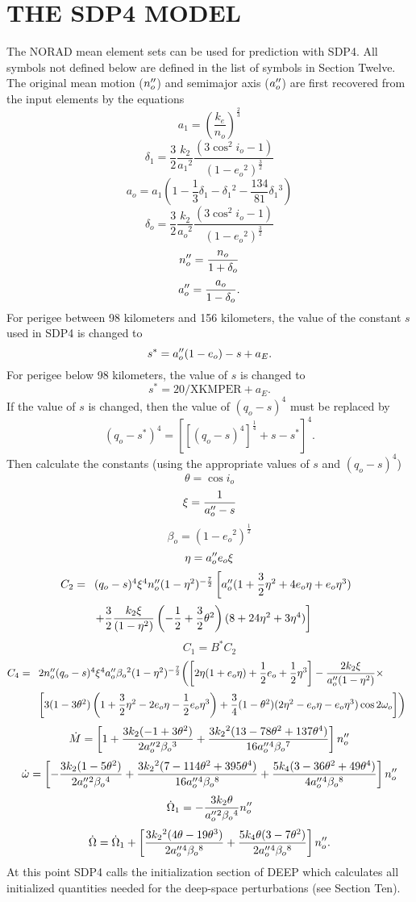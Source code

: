 \section[The SDP4 Model]{THE SDP4 MODEL}
The NORAD mean element sets can be used for prediction with SDP4.  All symbols
not defined below are defined in the list of symbols in Section Twelve.  The
original mean motion ($n''_o$) and semimajor axis ($a''_o$) are first
recovered from the input elements by the equations
\[a_1=\left(\dfrac{k_e}{n_o}\right)^{\frac23}\]
\[\delta_1=\dfrac32\dfrac{k_2}{a_1{}^2}\dfrac{(3\cos^2i_o-1)}
{(1-e_o{}^2)^{\frac32}}\]
\[a_o=a_1\left(1-\dfrac13\delta_1-\delta_1{}^2-\dfrac{134}{81}\delta_1{}^3\right)\]
\[\delta_o=\dfrac32\dfrac{k_2}{a_o{}^2}\dfrac{(3\cos^2i_o-1)}{(1-e_o{}^2)^{\frac32}}\]
\[n''_o={\displaystyle{n_o\over1+\delta_o}}\]
\[a''_o={\displaystyle{a_o\over1-\delta_o}}.\]
For perigee between 98 kilometers and 156 kilometers, the value of the
constant $s$ used in SDP4 is changed to
\[s^*=a''_o(1-e_o)-s+a_E.\]
For perigee below 98 kilometers, the value of $s$ is changed to
\[s^*=20/\mbox{XKMPER}+a_E.\]
If the value of $s$ is changed, then the value of $(q_o-s)^4$ must be replaced
by
\[(q_o-s^*)^4=\left[[(q_o-s)^4]^{\frac14}+s-s^*\right]^4.\]
Then calculate the constants (using the appropriate values of $s$ and
$(q_o-s)^4$)
\[\theta=\cos i_o\]
\[\xi={\displaystyle{1\over a''_o-s}}\]
\[\beta_o=(1-e_o{}^2)^{\frac12}\]
\[\eta=a''_o e_o\xi\]
\[C_2=\begin{array}[t]{l}(q_o-s)^4\xi^4n''_o(1-\eta^2)^{-\frac72}
\left[a''_o(1+{\displaystyle{3\over2}}\eta^2+4e_o\eta+e_o\eta^3)\right.\\[12pt]
\left.+{\displaystyle{3\over2}}{\displaystyle{k_2\xi\over(1-\eta^2)}}
\left(-{\displaystyle{1\over2}}+{\displaystyle{3\over2}}\theta^2\right)(8+24\eta^2+3\eta^4)\right]
\end{array}\]
\[C_1=B^*C_2\]
\[C_4=\begin{array}[t]{l}
2n''_o(q_o-s)^4\xi^4a''_o\beta_o{}^2(1-\eta^2)^{-\frac72}
\biggl(\left[2\eta(1+e_o\eta)+{\displaystyle{1\over2}}e_o+{\displaystyle{1\over2}}\eta^3\right]
-{\displaystyle{2k_2\xi\over a''_o(1-\eta^2)}}\times\\[12pt]
\left[3(1-3\theta^2)\left(1+{\displaystyle{3\over2}}\eta^2-2e_o\eta-{\displaystyle{1\over2}}e_o\eta^3\right)
+{\displaystyle{3\over4}}(1-\theta^2)(2\eta^2-e_o\eta-e_o\eta^3)\cos 2\omega_o\right]\biggr)
\end{array}\]
\[\dot{M}=\left[1+{\displaystyle{3k_2(-1+3\theta^2)\over2a''_o{}^2\beta_o{}^3}}
+{\displaystyle{3k_2{}^2(13-78\theta^2+137\theta^4)\over16a''_o{}^4\beta_o{}^7}}\right]n''_o\]
\[\dot{\omega} = \left[-{\displaystyle{3k_2(1-5\theta^2)\over2a''_o{}^2\beta_o{}^4}}
+{\displaystyle{3k_2{}^2(7-114\theta^2+395\theta^4)\over16a''_o{}^4\beta_o{}^8}}
+{\displaystyle{5k_4(3-36\theta^2+49\theta^4)\over4a''_o{}^4\beta_o{}^8}}\right]n''_o\]
\[\dot{\Omega}_1=-{\displaystyle{3k_2\theta\over a''_o{}^2\beta_o{}^4}}n''_o\]
\[\dot{\Omega}=\dot{\Omega}_1+\left[{\displaystyle{3k_2{}^2(4\theta-19\theta^3)\over2a''_o{}^4\beta_o{}^8}}
+{\displaystyle{5k_4\theta(3-7\theta^2)\over2a''_o{}^4\beta_o{}^8}}\right]n''_o.\]
At this point SDP4 calls the initialization section of DEEP which calculates
all initialized quantities needed for the deep-space perturbations (see
Section Ten).

